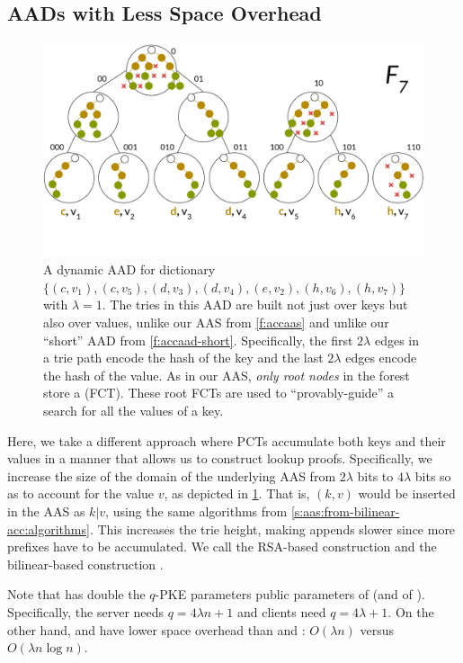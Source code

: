 \subsection{AADs with Less Space Overhead}
\label{s:aad:from-acc:tall}
\begin{figure}[t]
    \centering
    \includegraphics[width=.90\columnwidth]{figures-aad/accaad-tall.pdf}
    \vspace{-1.7cm}
    \caption{
        A dynamic AAD for dictionary $\{(c,v_1),(c,v_5),(d,v_3),(d,v_4),(e,v_2),(h,v_6),(h,v_7)\}$ with $\lambda=1$.
        The tries in this AAD are built not just over keys but also over values, unlike our AAS from \cref{f:accaas} and unlike our ``short'' AAD from \cref{f:accaad-short}.
        Specifically, the first $2\lambda$ edges in a trie path encode the hash of the key and the last $2\lambda$ edges encode the hash of the value.
        As in our AAS, \textit{only root nodes} in the forest store a \frontierCommunionTree (FCT).
        These root FCTs are used to ``provably-guide'' a search for all the values of a key.
    }
    \label{f:accaad-tall}
\end{figure}

Here, we take a different approach where PCTs accumulate both keys and their values in a manner that allows us to construct lookup proofs.
Specifically, we increase the size of the domain of the underlying AAS from $2\lambda$ bits to $4\lambda$ bits so as to account for the value $v$, as depicted in \cref{f:accaad-tall}.
That is, $(k,v)$ would be inserted in the AAS as $k|v$, using the same algorithms from \cref{s:aas:from-bilinear-acc:algorithms}.
This increases the trie height, making appends slower since more prefixes have to be accumulated.
We call the RSA-based construction \rsaaad and the bilinear-based construction \biaad.

Note that \biaad has double the $q$-PKE parameters public parameters of \biaas (and of \biaadset).
Specifically, the server needs $q=4\lambda n + 1$ and clients need $q=4\lambda+1$.
On the other hand, \biaad and \rsaaad have lower space overhead than \biaadset and \rsaaad: $O(\lambda n)$ versus $O(\lambda n\log{n})$.

